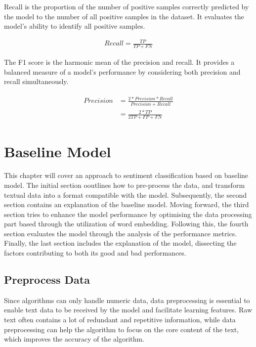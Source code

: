 \documentclass[ %
                    author={Louis Wang},
                supervisor={Dr. Qiang Liu},
                    degree={MSc},
                     title={Identification of Suicide Ideation in Texts},
                      type={},
                      year={2024}]{dissertation}
\begin{document}
Recall is the proportion of the number of positive samples correctly predicted by the model to the number of all positive samples in the dataset. It evaluates the model's ability to identify all positive samples.

\begin{eqnarray}
      Recall = \frac{TP}{TP + FN}
      \label{rec}
\end{eqnarray}

The F1 score is the harmonic mean of the precision and recall. It provides a balanced measure of a model's performance by considering both precision and recall simultaneously.

\begin{eqnarray}
      \begin{aligned}
            Precision &= \frac{2\ast Precision \ast Recall}{Precision + Recall} \\
                      &= \frac{2\ast TP}{2 TP + FP + FN}
      \end{aligned}
      \label{f1s}
\end{eqnarray}



\chapter{Baseline Model}
\label{chap:execution1}

\noindent
This chapter will cover an approach to sentiment classification based on baseline model. The initial section ooutlines how to pre-process the data, and transform textual data into a format compatible with the model. Subsequently, the second section contains an explanation of the baseline model. Moving forward, the third section tries to enhance the model performance by optimising the data processing part based through the utilization of word embedding. Following this, the fourth section evaluates the model through the analysis of the performance metrics. Finally, the last section includes the explanation of the model, dissecting the factors contributing to both its good and bad performances.

\section{Preprocess Data}
\noindent
Since algorithms can only handle numeric data, data preprocessing is essential to enable text data to be received by the model and facilitate learning features. Raw text often contains a lot of redundant and repetitive information, while data preprocessing can help the algorithm to focus on the core content of the text, which improves the accuracy of the algorithm.
\end{document}

